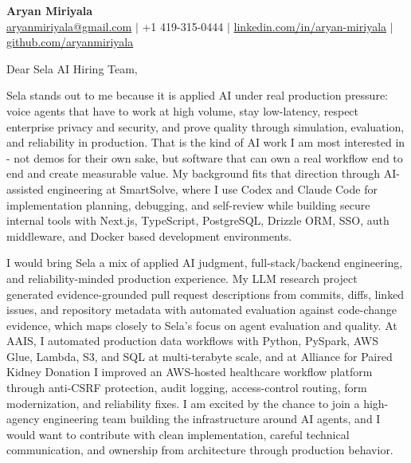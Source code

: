 \documentclass[11pt]{letter}
\begin{document}
\begin{center}
{\Large \textbf{Aryan Miriyala}}\\
\href{mailto:aryanmiriyala@gmail.com}{aryanmiriyala@gmail.com} $|$ +1 419-315-0444 $|$
\href{https://www.linkedin.com/in/aryan-miriyala-7788a21b6/}{linkedin.com/in/aryan-miriyala} $|$
\href{https://github.com/aryanmiriyala}{github.com/aryanmiriyala}
\end{center}

\vspace{0.15in}

Dear Sela AI Hiring Team,

Sela stands out to me because it is applied AI under real production pressure: voice agents that have to work at high volume, stay low-latency, respect enterprise privacy and security, and prove quality through simulation, evaluation, and reliability in production. That is the kind of AI work I am most interested in - not demos for their own sake, but software that can own a real workflow end to end and create measurable value. My background fits that direction through AI-assisted engineering at SmartSolve, where I use Codex and Claude Code for implementation planning, debugging, and self-review while building secure internal tools with Next.js, TypeScript, PostgreSQL, Drizzle ORM, SSO, auth middleware, and Docker based development environments.

I would bring Sela a mix of applied AI judgment, full-stack/backend engineering, and reliability-minded production experience. My LLM research project generated evidence-grounded pull request descriptions from commits, diffs, linked issues, and repository metadata with automated evaluation against code-change evidence, which maps closely to Sela's focus on agent evaluation and quality. At AAIS, I automated production data workflows with Python, PySpark, AWS Glue, Lambda, S3, and SQL at multi-terabyte scale, and at Alliance for Paired Kidney Donation I improved an AWS-hosted healthcare workflow platform through anti-CSRF protection, audit logging, access-control routing, form modernization, and reliability fixes. I am excited by the chance to join a high-agency engineering team building the infrastructure around AI agents, and I would want to contribute with clean implementation, careful technical communication, and ownership from architecture through production behavior.
\end{document}
